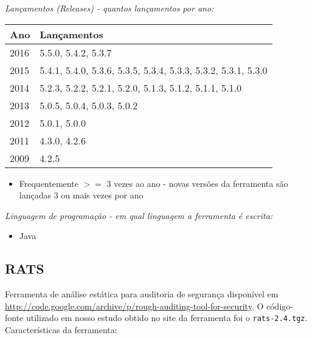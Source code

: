 \begin{description}

  \item {\it Lançamentos ({\it Releases}) - quantos lançamentos por ano:}
    \begin{table}[h!]
      \centering
      \begin{tabular}{| l | l |}
        \hline
        Ano  & Lançamentos                                                   \\
        \hline
        2016 & 5.5.0, 5.4.2, 5.3.7                                           \\
        2015 & 5.4.1, 5.4.0, 5.3.6, 5.3.5, 5.3.4, 5.3.3, 5.3.2, 5.3.1, 5.3.0 \\
        2014 & 5.2.3, 5.2.2, 5.2.1, 5.2.0, 5.1.3, 5.1.2, 5.1.1, 5.1.0        \\
        2013 & 5.0.5, 5.0.4, 5.0.3, 5.0.2                                    \\
        2012 & 5.0.1, 5.0.0                                                  \\
        2011 & 4.3.0, 4.2.6                                                  \\
        2009 & 4.2.5                                                         \\
        \hline
      \end{tabular}
    \end{table}
    \begin{itemize}
      \item Frequentemente $>=$ 3 vezes ao ano - novas versões da ferramenta são lançadas 3 ou mais vezes por ano
    \end{itemize}

  \item {\it Linguagem de programação - em qual linguagem a ferramenta é escrita:}
    \begin{itemize}
      \item Java
    \end{itemize}

\end{description}

\subsection{RATS}

Ferramenta de análise estática para auditoria de segurança disponível em
\url{http://code.google.com/archive/p/rough-auditing-tool-for-security}. O
código-fonte utilizado em nosso estudo obtido no site da ferramenta foi o
\texttt{rats-2.4.tgz}. Características da ferramenta:

